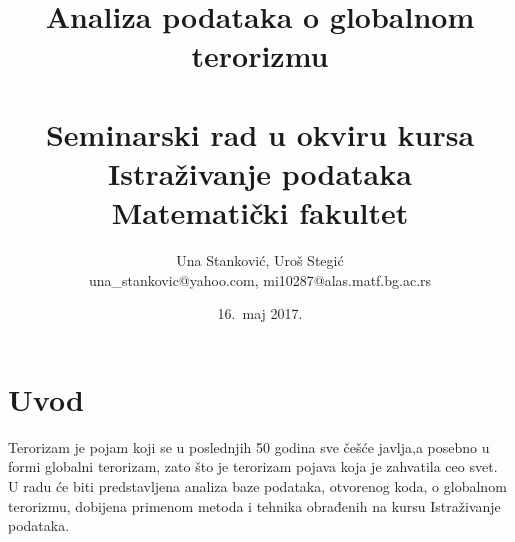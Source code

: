 \documentclass[a4paper]{article}
\begin{document}
\title{Analiza podataka o globalnom terorizmu \\ \small{~\\Seminarski rad u okviru kursa\\Istraživanje podataka\\ Matematički fakultet}}

\author{
	Una Stanković, Uroš Stegić\\
	una\_stankovic@yahoo.com, mi10287@alas.matf.bg.ac.rs}
\date{16.~maj 2017.}
\maketitle


\tableofcontents

\newpage


\section{Uvod}
\label{sec:uvod}
Terorizam je pojam koji se u poslednjih 50 godina sve češće javlja,a posebno u formi globalni terorizam, zato što je terorizam pojava koja je zahvatila ceo svet. U radu će biti predstavljena analiza baze podataka, otvorenog koda, o globalnom terorizmu, dobijena primenom metoda i tehnika obrađenih na kursu Istraživanje podataka.\\\\ 
\end{document}
